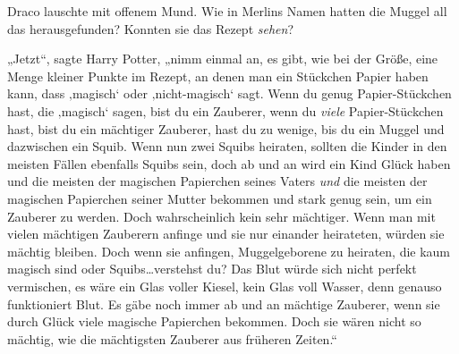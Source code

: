 Draco lauschte mit offenem Mund. Wie in Merlins Namen hatten die Muggel all das herausgefunden? Konnten sie das Rezept \emph{sehen}?

„Jetzt“, sagte Harry Potter, „nimm einmal an, es gibt, wie bei der Größe, eine Menge kleiner Punkte im Rezept, an denen man ein Stückchen Papier haben kann, dass ‚magisch‘ oder ‚nicht-magisch‘ sagt. Wenn du genug Papier-Stückchen hast, die ‚magisch‘ sagen, bist du ein Zauberer, wenn du \emph{viele} Papier-Stückchen hast, bist du ein mächtiger Zauberer, hast du zu wenige, bis du ein Muggel und dazwischen ein Squib. Wenn nun zwei Squibs heiraten, sollten die Kinder in den meisten Fällen ebenfalls Squibs sein, doch ab und an wird ein Kind Glück haben und die meisten der magischen Papierchen seines Vaters \emph{und} die meisten der magischen Papierchen seiner Mutter bekommen und stark genug sein, um ein Zauberer zu werden. Doch wahrscheinlich kein sehr mächtiger. Wenn man mit vielen mächtigen Zauberern anfinge und sie nur einander heirateten, würden sie mächtig bleiben. Doch wenn sie anfingen, Muggelgeborene zu heiraten, die kaum magisch sind oder Squibs…verstehst du? Das Blut würde sich nicht perfekt vermischen, es wäre ein Glas voller Kiesel, kein Glas voll Wasser, denn genauso funktioniert Blut. Es gäbe noch immer ab und an mächtige Zauberer, wenn sie durch Glück viele magische Papierchen bekommen. Doch sie wären nicht so mächtig, wie die mächtigsten Zauberer aus früheren Zeiten.“

